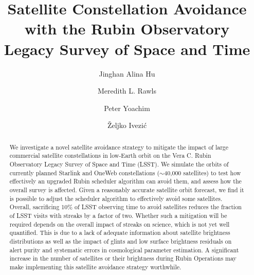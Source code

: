 \documentclass[twocolumn]{aastex631}
\begin{document}
\title{Satellite Constellation Avoidance with the Rubin Observatory Legacy Survey of Space and Time}

\author[0000-0002-8400-1910]{Jinghan Alina Hu}
\author[0000-0003-1305-7308]{Meredith L. Rawls}
\author[0000-0003-2874-6464]{Peter Yoachim}
\author[0000-0001-5250-2633]{\v{Z}eljko Ivezi\'{c}}


\begin{abstract}
We investigate a novel satellite avoidance strategy to mitigate the impact of large commercial satellite constellations in low-Earth orbit on the Vera C. Rubin Observatory Legacy Survey of Space and Time (LSST). We simulate the orbits of currently planned Starlink and OneWeb constellations ($\sim$40,000 satellites) to test how effectively an upgraded Rubin scheduler algorithm can avoid them, and assess how the overall survey is affected.
Given a reasonably accurate satellite orbit forecast, we find it is possible to adjust the scheduler algorithm to effectively avoid some satellites. Overall, sacrificing 10\% of LSST observing time to avoid satellites reduces the fraction of LSST visits with streaks by a factor of two. Whether such a mitigation will be required depends on the overall impact of streaks on science, which is not yet well quantified. This is due to a lack of adequate information about satellite brightness distributions as well as the impact of glints and low surface brightness residuals on alert purity and systematic errors in cosmological parameter estimation. A significant increase in the number of satellites or their brightness during Rubin Operations may make implementing this satellite avoidance strategy worthwhile.
\end{abstract}


\end{document}
